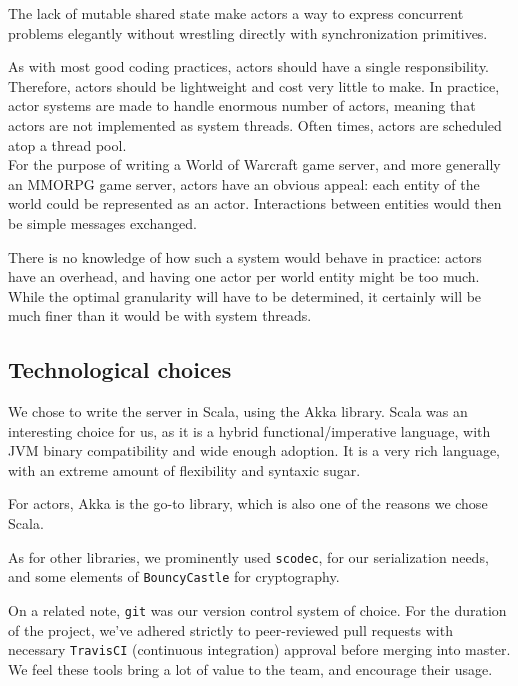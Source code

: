 \documentclass[paper=a4, fontsize=11pt]{scrartcl}
\begin{document}
The lack of mutable shared state make actors a way to express concurrent
problems elegantly without wrestling directly with synchronization primitives.

As with most good coding practices, actors should have a single responsibility.
Therefore, actors should be lightweight and cost very little to make.
In practice, actor systems are made to handle enormous number of actors, meaning
that actors are not implemented as system threads. Often times, actors are
scheduled atop a thread pool.\\

For the purpose of writing a World of Warcraft game server, and more generally
an MMORPG game server, actors have an obvious appeal: each entity of the world
could be represented as an actor.
Interactions between entities would then be simple messages exchanged.

There is no knowledge of how such a system would behave in practice: actors
have an overhead, and having one actor per world entity might be too much.
While the optimal granularity will have to be determined, it certainly will be
much finer than it would be with system threads.


\subsection{Technological choices}

We chose to write the server in Scala, using the Akka library.
Scala was an interesting choice for us, as it is a hybrid functional/imperative
language, with JVM binary compatibility and wide enough adoption.
It is a very rich language, with an extreme amount of flexibility and syntaxic
sugar.

For actors, Akka is the go-to library, which is also one of the reasons we chose
Scala.

As for other libraries, we prominently used \texttt{scodec}, for our
serialization needs, and some elements of \texttt{BouncyCastle} for
cryptography.

On a related note, \texttt{git} was our version control system of choice.
For the duration of the project, we've adhered strictly to peer-reviewed pull
requests with necessary \texttt{TravisCI} (continuous integration) approval
before merging into master.
We feel these tools bring a lot of value to the team, and encourage their usage.
\end{document}
